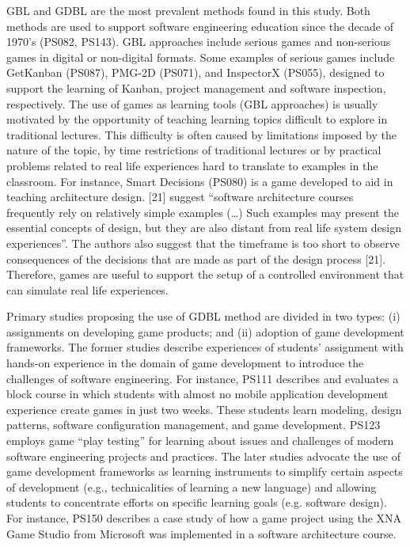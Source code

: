 GBL and GDBL are the most prevalent methods found in this study. Both methods are used to support software engineering education since the decade of 1970’s (PS082, PS143). GBL approaches include serious games and non-serious games in digital or non-digital formats. Some examples of serious games include GetKanban (PS087), PMG-2D (PS071), and InspectorX (PS055), designed to support the learning of Kanban, project management and software inspection, respectively. The use of games as learning tools (GBL approaches) is usually motivated by the opportunity of teaching learning topics difficult to explore in traditional lectures. This difficulty is often caused by limitations imposed by the nature of the topic, by time restrictions of traditional lectures or by practical problems related to real life experiences hard to translate to examples in the classroom. 	 For instance, Smart Decisions (PS080) is a game developed to aid in teaching architecture design. \cite{Cervantes:2016}[21] suggest “software architecture courses frequently rely on relatively simple examples (…) Such examples may present the essential concepts of design, but they are also distant from real life system design experiences”. The authors also suggest that the timeframe is too short to observe consequences of the decisions that are made as part of the design process \citep{Cervantes:2016}[21]. Therefore, games are useful to support the setup of a controlled environment that can simulate real life experiences. 

Primary studies proposing the use of GDBL method are divided in two types: (i) assignments on developing game products; and (ii) adoption of game development frameworks. The former studies describe experiences of students’ assignment with hands-on experience in the domain of game development to introduce the challenges of software engineering. For instance, PS111 describes and evaluates a block course in which students with almost no mobile application development experience create games in just two weeks. These students learn modeling, design patterns, software configuration management, and game development. PS123 employs game “play testing” for learning about issues and challenges of modern software engineering projects and practices. The later studies advocate the use of game development frameworks as learning instruments to simplify certain aspects of development (e.g., technicalities of learning a new language) and allowing students to concentrate efforts on specific learning goals (e.g. software design). For instance, PS150 describes a case study of how a game project using the XNA Game Studio from Microsoft was implemented in a software architecture course.


